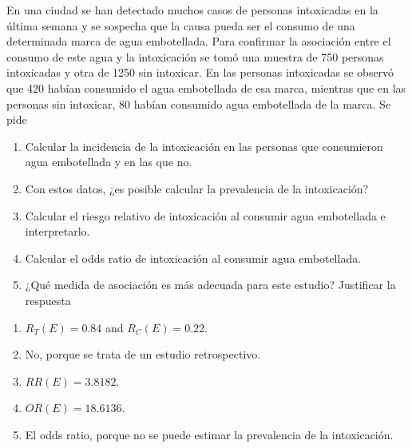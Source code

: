 {En una ciudad se han detectado muchos casos de personas intoxicadas en la última semana y se sospecha que la causa pueda ser el consumo de una determinada marca de agua embotellada.
Para confirmar la asociación entre el consumo de este agua y la intoxicación se tomó una muestra de 750 personas intoxicadas y otra de 1250 sin intoxicar.
En las personas intoxicadas se observó que 420 habían consumido el agua embotellada de esa marca, mientras que en las personas sin intoxicar, 80 habían consumido agua embotellada de la marca.
Se pide
\begin{enumerate}
\item Calcular la incidencia de la intoxicación en las personas que consumieron agua embotellada y en las que no.
\item Con estos datos, ¿es posible calcular la prevalencia de la intoxicación?
\item Calcular el riesgo relativo de intoxicación al consumir agua embotellada e interpretarlo.
\item Calcular el odds ratio de intoxicación al consumir agua embotellada.
\item ¿Qué medida de asociación es más adecuada para este estudio? Justificar la respuesta
\end{enumerate}
}
{
\begin{enumerate}
\item $R_T(E)=0.84$ and $R_C(E)=0.22$.
\item No, porque se trata de un estudio retrospectivo.
\item $RR(E)=3.8182$.
\item $OR(E)=18.6136$.
\item El odds ratio, porque no se puede estimar la prevalencia de la intoxicación.
\end{enumerate}
}
{
}

